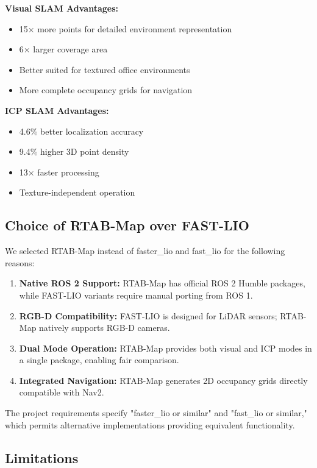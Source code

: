 \documentclass[conference]{IEEEtran}
\begin{document}
\textbf{Visual SLAM Advantages:}
\begin{itemize}
    \item 15× more points for detailed environment representation
    \item 6× larger coverage area
    \item Better suited for textured office environments
    \item More complete occupancy grids for navigation
\end{itemize}

\textbf{ICP SLAM Advantages:}
\begin{itemize}
    \item 4.6\% better localization accuracy
    \item 9.4\% higher 3D point density
    \item 13× faster processing
    \item Texture-independent operation
\end{itemize}

\subsection{Choice of RTAB-Map over FAST-LIO}

We selected RTAB-Map instead of faster\_lio and fast\_lio for the following reasons:

\begin{enumerate}
    \item \textbf{Native ROS 2 Support:} RTAB-Map has official ROS 2 Humble packages, while FAST-LIO variants require manual porting from ROS 1.
    \item \textbf{RGB-D Compatibility:} FAST-LIO is designed for LiDAR sensors; RTAB-Map natively supports RGB-D cameras.
    \item \textbf{Dual Mode Operation:} RTAB-Map provides both visual and ICP modes in a single package, enabling fair comparison.
    \item \textbf{Integrated Navigation:} RTAB-Map generates 2D occupancy grids directly compatible with Nav2.
\end{enumerate}

The project requirements specify "faster\_lio or similar" and "fast\_lio or similar," which permits alternative implementations providing equivalent functionality.

\subsection{Limitations}
\end{document}
